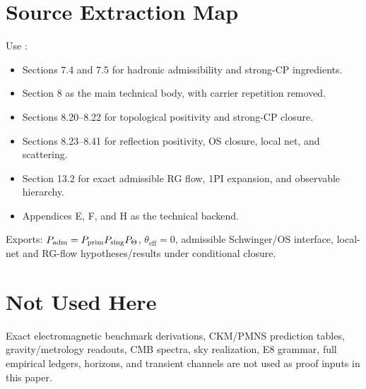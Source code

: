 \documentclass[11pt,a4paper]{article}
\begin{document}
\tfptDraftXrefNotice



\section{Source Extraction Map}

\begin{tfptsourcebox}
Use \sourceDraft:
\begin{itemize}[leftmargin=1.5em]
    \item Sections 7.4 and 7.5 for hadronic admissibility and strong-CP ingredients.
    \item Section 8 as the main technical body, with carrier repetition removed.
    \item Sections 8.20--8.22 for topological positivity and strong-CP closure.
    \item Sections 8.23--8.41 for reflection positivity, OS closure, local net, and scattering.
    \item Section 13.2 for exact admissible RG flow, 1PI expansion, and observable hierarchy.
    \item Appendices E, F, and H as the technical backend.
\end{itemize}
\end{tfptsourcebox}


\begin{tfptexports}
Exports: $P_{\mathrm{adm}}=P_{\mathrm{prim}} P_{\mathrm{sing}}P_\Theta$, $\theta_{\mathrm{eff}}=0$, admissible Schwinger/OS interface, local-net and RG-flow hypotheses/results under conditional closure.
\end{tfptexports}

\section{Not Used Here}

Exact electromagnetic benchmark derivations, CKM/PMNS prediction tables, gravity/metrology
readouts, CMB spectra, sky realization, E8 grammar, full empirical ledgers, horizons, and transient
channels are not used as proof inputs in this paper.
\end{document}
